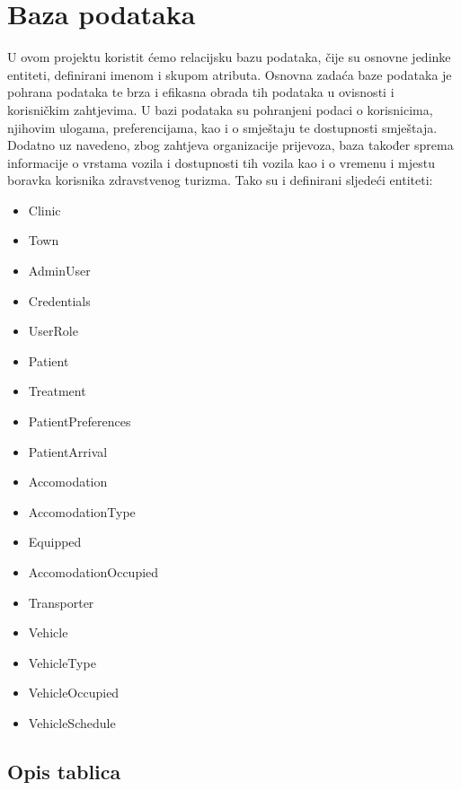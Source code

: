 		

				
		\section{Baza podataka}
			
			
			U ovom projektu koristit ćemo relacijsku bazu podataka, čije su osnovne jedinke entiteti, definirani imenom i skupom atributa. Osnovna zadaća baze podataka je pohrana podataka te brza i efikasna obrada tih podataka u ovisnosti i korisničkim zahtjevima. U bazi podataka su pohranjeni podaci o korisnicima, njihovim ulogama, preferencijama, kao i o smještaju te dostupnosti smještaja. Dodatno uz navedeno, zbog zahtjeva organizacije prijevoza, baza također sprema informacije o vrstama vozila i dostupnosti tih vozila kao i o vremenu i mjestu boravka korisnika zdravstvenog turizma. Tako su i definirani sljedeći entiteti:
			\begin{itemize}
				\item Clinic
				\item Town
				\item AdminUser
				\item Credentials
				\item UserRole
				\item Patient
				\item Treatment
				\item PatientPreferences
				\item PatientArrival
				\item Accomodation
				\item AccomodationType
				\item Equipped
				\item AccomodationOccupied
				\item Transporter
				\item Vehicle
				\item VehicleType
				\item VehicleOccupied
				\item VehicleSchedule
			\end{itemize}
		
			\subsection{Opis tablica}
			
